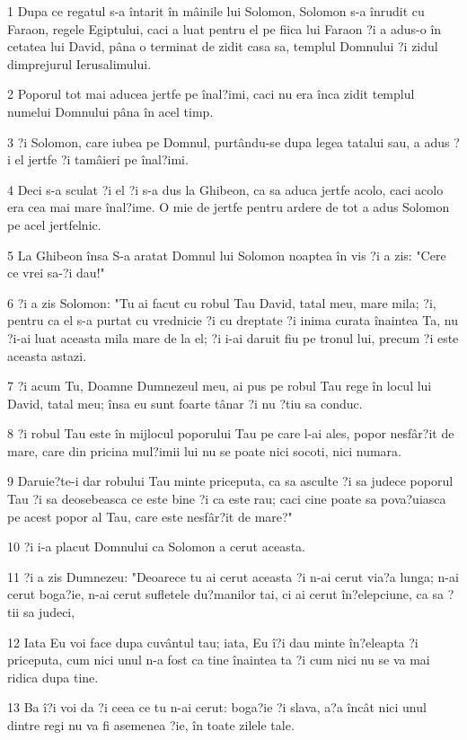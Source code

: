 \par 1 Dupa ce regatul s-a întarit în mâinile lui Solomon, Solomon s-a înrudit cu Faraon, regele Egiptului, caci a luat pentru el pe fiica lui Faraon ?i a adus-o în cetatea lui David, pâna o terminat de zidit casa sa, templul Domnului ?i zidul dimprejurul Ierusalimului.
\par 2 Poporul tot mai aducea jertfe pe înal?imi, caci nu era înca zidit templul numelui Domnului pâna în acel timp.
\par 3 ?i Solomon, care iubea pe Domnul, purtându-se dupa legea tatalui sau, a adus ?i el jertfe ?i tamâieri pe înal?imi.
\par 4 Deci s-a sculat ?i el ?i s-a dus la Ghibeon, ca sa aduca jertfe acolo, caci acolo era cea mai mare înal?ime. O mie de jertfe pentru ardere de tot a adus Solomon pe acel jertfelnic.
\par 5 La Ghibeon însa S-a aratat Domnul lui Solomon noaptea în vis ?i a zis: "Cere ce vrei sa-?i dau!"
\par 6 ?i a zis Solomon: "Tu ai facut cu robul Tau David, tatal meu, mare mila; ?i, pentru ca el s-a purtat cu vrednicie ?i cu dreptate ?i inima curata înaintea Ta, nu ?i-ai luat aceasta mila mare de la el; ?i i-ai daruit fiu pe tronul lui, precum ?i este aceasta astazi.
\par 7 ?i acum Tu, Doamne Dumnezeul meu, ai pus pe robul Tau rege în locul lui David, tatal meu; însa eu sunt foarte tânar ?i nu ?tiu sa conduc.
\par 8 ?i robul Tau este în mijlocul poporului Tau pe care l-ai ales, popor nesfâr?it de mare, care din pricina mul?imii lui nu se poate nici socoti, nici numara.
\par 9 Daruie?te-i dar robului Tau minte priceputa, ca sa asculte ?i sa judece poporul Tau ?i sa deosebeasca ce este bine ?i ca este rau; caci cine poate sa pova?uiasca pe acest popor al Tau, care este nesfâr?it de mare?"
\par 10 ?i i-a placut Domnului ca Solomon a cerut aceasta.
\par 11 ?i a zis Dumnezeu: "Deoarece tu ai cerut aceasta ?i n-ai cerut via?a lunga; n-ai cerut boga?ie, n-ai cerut sufletele du?manilor tai, ci ai cerut în?elepciune, ca sa ?tii sa judeci,
\par 12 Iata Eu voi face dupa cuvântul tau; iata, Eu î?i dau minte în?eleapta ?i priceputa, cum nici unul n-a fost ca tine înaintea ta ?i cum nici nu se va mai ridica dupa tine.
\par 13 Ba î?i voi da ?i ceea ce tu n-ai cerut: boga?ie ?i slava, a?a încât nici unul dintre regi nu va fi asemenea ?ie, în toate zilele tale.
